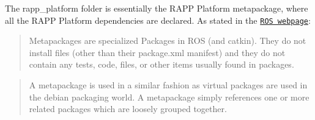 The {\ttfamily rapp\-\_\-platform} folder is essentially the R\-A\-P\-P Platform metapackage, where all the R\-A\-P\-P Platform dependencies are declared. As stated in the \href{http://wiki.ros.org/Metapackages}{\tt R\-O\-S webpage}\-:

\begin{quotation}
Metapackages are specialized Packages in R\-O\-S (and catkin). They do not install files (other than their package.\-xml manifest) and they do not contain any tests, code, files, or other items usually found in packages.

\end{quotation}


\begin{quotation}
A metapackage is used in a similar fashion as virtual packages are used in the debian packaging world. A metapackage simply references one or more related packages which are loosely grouped together. \end{quotation}
